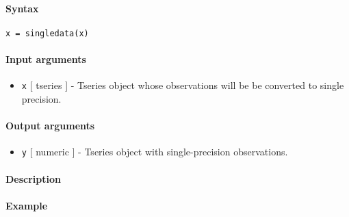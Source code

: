 


	\paragraph{Syntax}

\begin{verbatim}
x = singledata(x)
\end{verbatim}

\paragraph{Input arguments}

\begin{itemize}
\itemsep1pt\parskip0pt
\item
  \texttt{x} {[} tseries {]} - Tseries object whose observations will be
  be converted to single precision.
\end{itemize}

\paragraph{Output arguments}

\begin{itemize}
\itemsep1pt\parskip0pt
\item
  \texttt{y} {[} numeric {]} - Tseries object with single-precision
  observations.
\end{itemize}

\paragraph{Description}

\paragraph{Example}


